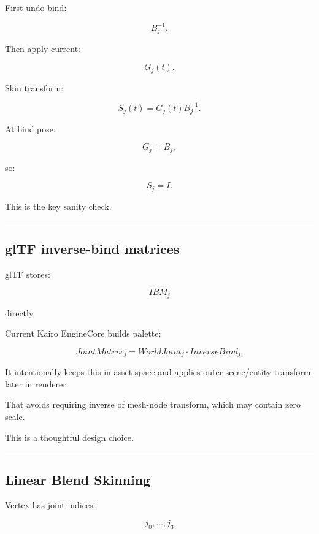 First undo bind:

\[
B_j^{-1}.
\]

Then apply current:

\[
G_j(t).
\]

Skin transform:

\[
\boxed{
S_j(t)
=
G_j(t)
B_j^{-1}.
}
\]

At bind pose:

\[
G_j=B_j,
\]

so:

\[
S_j=
I.
\]

This is the key sanity check.

\begin{center}\rule{0.5\linewidth}{0.5pt}\end{center}

\subsection{glTF inverse-bind matrices}\label{04-visual-computing-ii-ch041-gltf-inverse-bind-matrices}

\hypertarget{04-visual-computing-ii-ch041-gltf-inverse-bind-matrices}{}

glTF stores:

\[
IBM_j
\]

directly.

Current Kairo EngineCore builds palette:

\[
\boxed{
JointMatrix_j
=
WorldJoint_j
\cdot
InverseBind_j.
}
\]

It intentionally keeps this in asset space and applies outer scene/entity transform later in renderer.

That avoids requiring inverse of mesh-node transform, which may contain zero scale.

This is a thoughtful design choice.

\begin{center}\rule{0.5\linewidth}{0.5pt}\end{center}

\subsection{Linear Blend Skinning}\label{04-visual-computing-ii-ch041-linear-blend-skinning}

\hypertarget{04-visual-computing-ii-ch041-linear-blend-skinning}{}

Vertex has joint indices:

\[
j_0,\dots,j_3
\]

